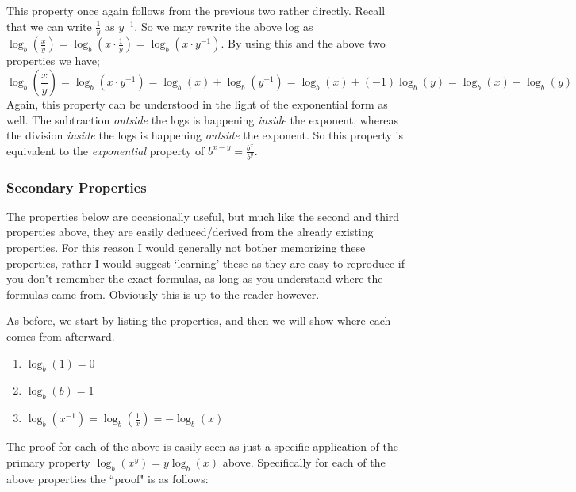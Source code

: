             This property once again follows from the previous two rather directly. Recall that we can write $\frac{1}{y}$ as $y^{-1}$. So we may rewrite the above log as $\log_b\left(\frac{x}{y}\right) = \log_b\left(x \cdot \frac{1}{y}\right) = \log_b\left(x\cdot y^{-1}\right)$. By using this and the above two properties we have;
            \[
                \log_b\left(\frac{x}{y}\right)  = \log_b\left(x\cdot y^{-1}\right) 
                                                = \log_b(x) + \log_b\left(y^{-1}\right) 
                                                = \log_b(x) + (-1)\log_b(y)
                                                = \log_b(x) - \log_b(y) 
            \]
            Again, this property can be understood in the light of the exponential form as well. The subtraction \textit{outside} the logs is happening \textit{inside} the exponent, whereas the division \textit{inside} the logs is happening \textit{outside} the exponent. So this property is equivalent to the \textit{exponential} property of $b^{x-y}=\frac{b^x}{b^y}$.
    \subsubsection{Secondary Properties}
        The properties below are occasionally useful, but much like the second and third properties above, they are easily deduced/derived from the already existing properties. For this reason I would generally not bother memorizing these properties, rather I would suggest `learning' these as they are easy to reproduce if you don't remember the exact formulas, as long as you understand where the formulas came from. Obviously this is up to the reader however.
        
        As before, we start by listing the properties, and then we will show where each comes from afterward.
        
        \begin{enumerate}
            \item $\log_b(1) = 0$
            \item $\log_b(b) = 1$
            \item $\log_b\left(x^{-1}\right) = \log_b\left(\frac{1}{x}\right) = -\log_b(x)$
        \end{enumerate}
        
        The proof for each of the above is easily seen as just a specific application of the primary property $\log_b\left(x^y\right) = y\log_b(x)$ above. Specifically for each of the above properties the ``proof" is as follows:
        
